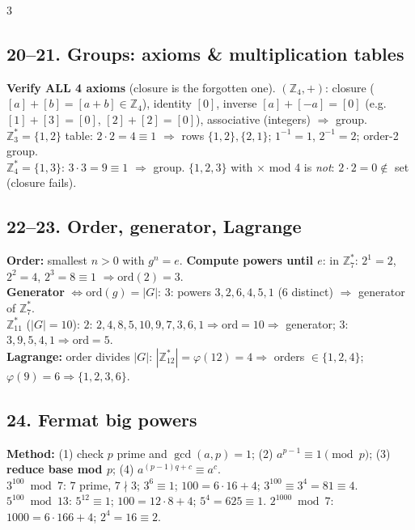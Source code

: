 \documentclass[9pt]{extarticle}
\newcommand{\hl}[1]{\textbf{\textcolor{BrickRed}{#1}}}
\begin{document}
\begin{multicols}{3}
\subsection{20--21. Groups: axioms \& multiplication tables}
\begin{sloppypar}\raggedright
\hl{Verify ALL 4 axioms} (closure is the forgotten one). $(\mathbb Z_4,{+})$: closure ($[a]{+}[b]{=}[a{+}b]\in\mathbb Z_4$), identity $[0]$, inverse $[a]{+}[-a]{=}[0]$ (e.g. $[1]{+}[3]{=}[0]$, $[2]{+}[2]{=}[0]$), associative (integers) $\Rightarrow$ group.\\
$\mathbb Z_3^*{=}\{1,2\}$ table: $2{\cdot}2{=}4\equiv1$ $\Rightarrow$ rows $\{1,2\},\{2,1\}$; $1^{-1}{=}1$, $2^{-1}{=}2$; order-2 group.\\
$\mathbb Z_4^*{=}\{1,3\}$: $3{\cdot}3{=}9\equiv1$ $\Rightarrow$ group. $\{1,2,3\}$ with $\times$ mod 4 is \emph{not}: $2{\cdot}2{=}0\notin$ set (closure fails).
\end{sloppypar}

\subsection{22--23. Order, generator, Lagrange}
\begin{sloppypar}\raggedright
\textbf{Order:} smallest $n{>}0$ with $g^n{=}e$. \hl{Compute powers until $e$}: in $\mathbb Z_7^*$: $2^1{=}2$, $2^2{=}4$, $2^3{=}8\equiv1$ $\Rightarrow\mathrm{ord}(2){=}3$.\\
\textbf{Generator} $\iff\mathrm{ord}(g){=}|G|$: $3$: powers $3,2,6,4,5,1$ (6 distinct) $\Rightarrow$ generator of $\mathbb Z_7^*$.\\
$\mathbb Z_{11}^*$ ($|G|{=}10$): $2$: $2,4,8,5,10,9,7,3,6,1\Rightarrow\mathrm{ord}{=}10\Rightarrow$ generator; $3$: $3,9,5,4,1\Rightarrow\mathrm{ord}{=}5$.\\
\textbf{Lagrange:} order divides $|G|$: $|\mathbb Z_{12}^*|{=}\varphi(12){=}4\Rightarrow$ orders $\in\{1,2,4\}$; $\varphi(9){=}6\Rightarrow\{1,2,3,6\}$.
\end{sloppypar}

\subsection{24. Fermat big powers}
\begin{sloppypar}\raggedright
\textbf{Method:} (1) check $p$ prime and $\gcd(a,p){=}1$; (2) $a^{p-1}\equiv1\pmod p$; (3) \hl{reduce base mod $p$}; (4) $a^{(p-1)q{+}c}\equiv a^c$.\\
$3^{100}\bmod7$: $7$ prime, $7\nmid3$; $3^6\equiv1$; $100{=}6{\cdot}16{+}4$; $3^{100}\equiv3^4{=}81\equiv4$.\\
$5^{100}\bmod13$: $5^{12}\equiv1$; $100{=}12{\cdot}8{+}4$; $5^4{=}625\equiv1$. $2^{1000}\bmod7$: $1000{=}6{\cdot}166{+}4$; $2^4{=}16\equiv2$.
\end{sloppypar}


\end{multicols}
\end{document}
